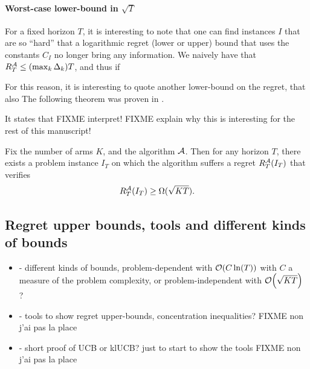 \paragraph{Worst-case lower-bound in $\sqrt{T}$}

For a fixed horizon $T$, it is interesting to note that one can find instances $I$ that are so ``hard'' that a logarithmic regret (lower or upper) bound that uses the constants $C_I$ no longer bring any information.
We naively have that $R_T^{\mathcal{A}} \leq (\max_k \Delta_k) T$, and thus if 

For this reason, it is interesting to quote another lower-bound on the regret, that also
The following theorem was proven in \cite{Auer02NonStochastic}.

It states that FIXME interpret!
FIXME explain why this is interesting for the rest of this manuscript!

\begin{theorem}\label{thm:2:worstCaseLowerBound}
    Fix the number of arms $K$, and the algorithm $\mathcal{A}$.
    Then for any horizon $T$, there exists a problem instance $I_T$ on which the algorithm suffers a regret $R_T^{\mathcal{A}}(I_T)$ that verifies
    \begin{equation}
        R_T^{\mathcal{A}}(I_T) \geq \Omega(\sqrt{K T}).
    \end{equation}
\end{theorem}







\subsection{Regret upper bounds, tools and different kinds of bounds}


\begin{itemize}
    \item
    - different kinds of bounds, problem-dependent with $\mathop{}\mathopen{}\mathcal{O}\mathopen{}\left(C \ln(T)\right)$ with $C$ a measure of the problem complexity, or problem-independent with $\mathop{}\mathopen{}\mathcal{O}\mathopen{}\left(\sqrt{KT}\right)$ ?
    \item
    - tools to show regret upper-bounds, concentration inequalities?
    FIXME non j'ai pas la place
    \item
    - short proof of UCB or klUCB? just to start to show the tools
    FIXME non j'ai pas la place
\end{itemize}


